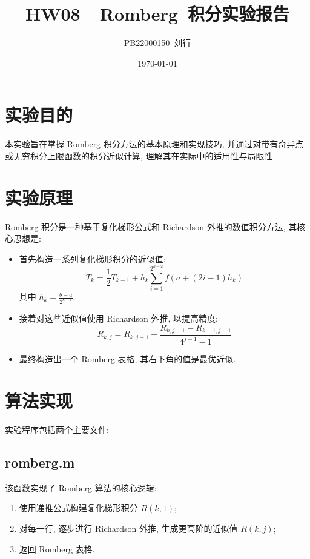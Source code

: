 \documentclass[12pt]{article}
\title{HW08~~Romberg~积分实验报告}
\author{PB22000150~刘行}
\date{\today}
\begin{document}
\maketitle
	\section{实验目的}
		本实验旨在掌握 Romberg 积分方法的基本原理和实现技巧, 并通过对带有奇异点或无穷积分上限函数的积分近似计算, 理解其在实际中的适用性与局限性.

	\section{实验原理}
		Romberg 积分是一种基于复化梯形公式和 Richardson 外推的数值积分方法, 其核心思想是:

		\begin{itemize}
			\item 首先构造一系列复化梯形积分的近似值:
			\begin{equation}
				T_k = \frac{1}{2} T_{k-1} + h_k \sum_{i=1}^{2^{k-2}} f\left(a + (2i - 1) h_k\right)
			\end{equation}
			其中 $h_k = \frac{b-a}{2^{k-1}}$.
			
			\item 接着对这些近似值使用 Richardson 外推, 以提高精度:
			\begin{equation}
				R_{k,j} = R_{k,j-1} + \frac{R_{k,j-1} - R_{k-1,j-1}}{4^{j-1} - 1}
			\end{equation}
			
			\item 最终构造出一个 Romberg 表格, 其右下角的值是最优近似.
		\end{itemize}

	\section{算法实现}
		实验程序包括两个主要文件:

	\subsection{romberg.m}
		该函数实现了 Romberg 算法的核心逻辑:

		\begin{enumerate}
			\item 使用递推公式构建复化梯形积分 $R(k,1)$;
			\item 对每一行, 逐步进行 Richardson 外推, 生成更高阶的近似值 $R(k,j)$;
			\item 返回 Romberg 表格.
		\end{enumerate}
\end{document}

